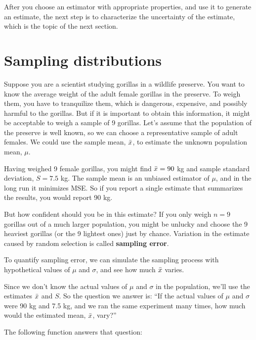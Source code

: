 \documentclass[12pt]{book}
\begin{document}
After you choose an estimator with appropriate properties, and use it to
generate an estimate, the next step is to characterize the
uncertainty of the estimate, which is the topic of the next
section.


\section{Sampling distributions}
\label{gorilla}

Suppose you are a scientist studying gorillas in a wildlife
preserve.  You want to know the average weight of the adult
female gorillas in the preserve.  To weigh them, you have
to tranquilize them, which is dangerous, expensive, and possibly
harmful to the gorillas.  But if it is important to obtain this
information, it might be acceptable to weigh a sample of 9
gorillas.  Let's assume that the population of the preserve is
well known, so we can choose a representative sample of adult
females.  We could use the sample mean, $\bar{x}$, to estimate the
unknown population mean, $\mu$.

Having weighed 9 female gorillas, you might find $\bar{x}=90$ kg and
sample standard deviation, $S=7.5$ kg.  The sample mean
is an unbiased estimator of $\mu$, and in the long run it
minimizes MSE.  So if you report a single
estimate that summarizes the results, you would report 90 kg.

But how confident should you be in this estimate?  If you only weigh
$n=9$ gorillas out of a much larger population, you might be unlucky
and choose the 9 heaviest gorillas (or the 9 lightest ones) just by
chance.  Variation in the estimate caused by random selection is
called {\bf sampling error}.

To quantify sampling error, we can simulate the
sampling process with hypothetical values of $\mu$ and $\sigma$, and
see how much $\bar{x}$ varies.

Since we don't know the actual values of 
$\mu$ and $\sigma$ in the population, we'll use the estimates
$\bar{x}$ and $S$.
So the question we answer is:
``If the actual values of $\mu$ and $\sigma$ were 90 kg and 7.5 kg,
and we ran the same experiment many times, how much would the
estimated mean, $\bar{x}$, vary?''

The following function answers that question:
\end{document}
